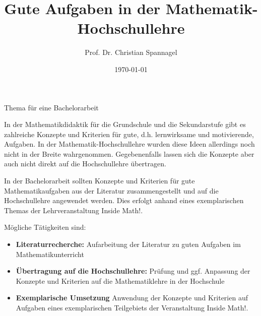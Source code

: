 \documentclass{../../cssheet}
\title{Gute Aufgaben in der Mathematik-Hochschullehre}
\author{Prof. Dr. Christian Spannagel}
\date{\today}
\begin{document}
\vspace*{5mm}
\begin{center}
{\Large Thema für eine Bachelorarbeit}
\end{center}

\printtitle
\vspace*{1cm}

In der Mathematikdidaktik für die Grundschule und die Sekundarstufe gibt es zahlreiche Konzepte und Kriterien für gute, d.h. lernwirksame und motivierende, Aufgaben. In der Mathematik-Hochschullehre wurden diese Ideen allerdings noch nicht in der Breite wahrgenommen. Gegebenenfalls lassen sich die Konzepte aber auch nicht direkt auf die Hochschullehre übertragen.  

In der Bachelorarbeit sollten Konzepte und Kriterien für gute Mathematikaufgaben aus der Literatur zusammengestellt und auf die Hochschullehre angewendet werden. Dies erfolgt anhand eines exemplarischen Themas der Lehrveranstaltung \glqq{}Inside Math!\grqq{}. 

Mögliche Tätigkeiten sind:
\begin{itemize}
\item \textbf{Literaturrecherche:} Aufarbeitung der Literatur zu guten Aufgaben im Mathematikunterricht
\item \textbf{Übertragung auf die Hochschullehre:} Prüfung und ggf. Anpassung der Konzepte und Kriterien auf die Mathematiklehre in der Hochschule
\item \textbf{Exemplarische Umsetzung} Anwendung der Konzepte und Kriterien auf Aufgaben eines exemplarischen Teilgebiets der Veranstaltung \glqq{}Inside Math!\grqq{}.
\end{itemize}

\vspace*{10mm}

\printlicense

\printsocials
\end{document}
